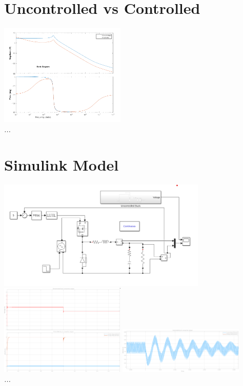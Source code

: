 \documentclass[11pt]{article}
\begin{document}
\begin{preview}
    \section{Uncontrolled vs Controlled}
    \begin{center}
        \includegraphics[width=0.45\textwidth]{img/comp.png}\\
        \textit{...}
    \end{center}
    
    \section{Simulink Model}
    \begin{center}
        \includegraphics[width=0.75\textwidth]{img/sim.png}\\
        \includegraphics[width=0.45\textwidth]{img/uncontrolled v controlled.png}
        \includegraphics[width=0.45\textwidth]{img/step_zoom.png}\\
        \textit{...}
    \end{center}
    

\end{preview}
\end{document}
